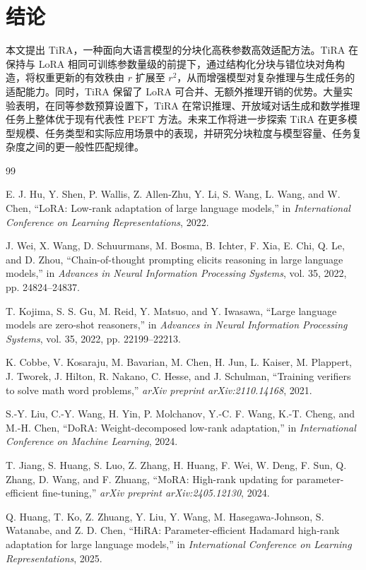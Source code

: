 \documentclass[UTF8,a4paper,11pt]{ctexart}
\begin{document}
\section{结论}

本文提出 TiRA，一种面向大语言模型的分块化高秩参数高效适配方法。TiRA 在保持与 LoRA 相同可训练参数量级的前提下，通过结构化分块与错位块对角构造，将权重更新的有效秩由 $r$ 扩展至 $r^2$，从而增强模型对复杂推理与生成任务的适配能力。同时，TiRA 保留了 LoRA 可合并、无额外推理开销的优势。大量实验表明，在同等参数预算设置下，TiRA 在常识推理、开放域对话生成和数学推理任务上整体优于现有代表性 PEFT 方法。未来工作将进一步探索 TiRA 在更多模型规模、任务类型和实际应用场景中的表现，并研究分块粒度与模型容量、任务复杂度之间的更一般性匹配规律。

\begin{thebibliography}{99}

E. J. Hu, Y. Shen, P. Wallis, Z. Allen-Zhu, Y. Li, S. Wang, L. Wang, and W. Chen, ``LoRA: Low-rank adaptation of large language models,'' in \emph{International Conference on Learning Representations}, 2022.

J. Wei, X. Wang, D. Schuurmans, M. Bosma, B. Ichter, F. Xia, E. Chi, Q. Le, and D. Zhou, ``Chain-of-thought prompting elicits reasoning in large language models,'' in \emph{Advances in Neural Information Processing Systems}, vol. 35, 2022, pp. 24824--24837.

T. Kojima, S. S. Gu, M. Reid, Y. Matsuo, and Y. Iwasawa, ``Large language models are zero-shot reasoners,'' in \emph{Advances in Neural Information Processing Systems}, vol. 35, 2022, pp. 22199--22213.

K. Cobbe, V. Kosaraju, M. Bavarian, M. Chen, H. Jun, L. Kaiser, M. Plappert, J. Tworek, J. Hilton, R. Nakano, C. Hesse, and J. Schulman, ``Training verifiers to solve math word problems,'' \emph{arXiv preprint arXiv:2110.14168}, 2021.

S.-Y. Liu, C.-Y. Wang, H. Yin, P. Molchanov, Y.-C. F. Wang, K.-T. Cheng, and M.-H. Chen, ``DoRA: Weight-decomposed low-rank adaptation,'' in \emph{International Conference on Machine Learning}, 2024.

T. Jiang, S. Huang, S. Luo, Z. Zhang, H. Huang, F. Wei, W. Deng, F. Sun, Q. Zhang, D. Wang, and F. Zhuang, ``MoRA: High-rank updating for parameter-efficient fine-tuning,'' \emph{arXiv preprint arXiv:2405.12130}, 2024.

Q. Huang, T. Ko, Z. Zhuang, Y. Liu, Y. Wang, M. Hasegawa-Johnson, S. Watanabe, and Z. D. Chen, ``HiRA: Parameter-efficient Hadamard high-rank adaptation for large language models,'' in \emph{International Conference on Learning Representations}, 2025.


\end{thebibliography}
\end{document}
